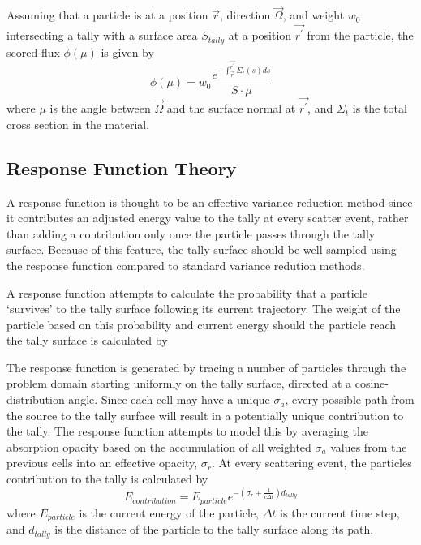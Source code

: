 \documentclass[]{article}
\begin{document}
		Assuming that a particle is at a position $\vec{r}$, direction $\vec{\Omega}$, and weight $w_{0}$ intersecting a tally with a surface area $S_{tally}$ at a position $\vec{r^{\prime}}$ from the particle, the scored flux $\phi(\mu)$ is given by 
		\begin{equation}
			\phi(\mu) = w_{0} \frac{e^{-\int_{\vec{r}}^{\vec{r^{\prime}}} \Sigma_{t}(s)ds}}{S \cdot \mu}
		\end{equation}
		where $\mu$ is the angle between $\vec{\Omega}$ and the surface normal at $\vec{r^{\prime}}$, and $\Sigma_{t}$ is the total cross section in the material.
		
	\subsection{Response Function Theory}
		A response function is thought to be an effective variance reduction method since it contributes an adjusted energy value to the tally at every scatter event, rather than adding a contribution only once the particle passes through the tally surface. Because of this feature, the tally surface should be well sampled using the response function compared to standard variance redution methods. 
		
		A response function attempts to calculate the probability that a particle `survives' to the tally surface following its current trajectory. The weight of the particle based on this probability and current energy should the particle reach the tally surface is calculated by
		
		The response function is generated by tracing a number of particles through the problem domain starting uniformly on the tally surface, directed at a cosine-distribution angle. Since each cell may have a unique $\sigma_{a}$, every possible path from the source to the tally surface will result in a potentially unique contribution to the tally. The response function attempts to model this by averaging the absorption opacity based on the accumulation of all weighted $\sigma_{a}$ values from the previous cells into an effective opacity, $\sigma_{r}$. At every scattering event, the particles contribution to the tally is calculated by
		\begin{equation}\label{Eq: tally_contr}
		E_{contribution} = E_{particle}e^{-(\sigma_{r} + \frac{1}{c \Delta t})d_{tally}}
		\end{equation}
		where $E_{particle}$ is the current energy of the particle, $\Delta t$ is the current time step, and $d_{tally}$ is the distance of the particle to the tally surface along its path. 
		
\end{document}
